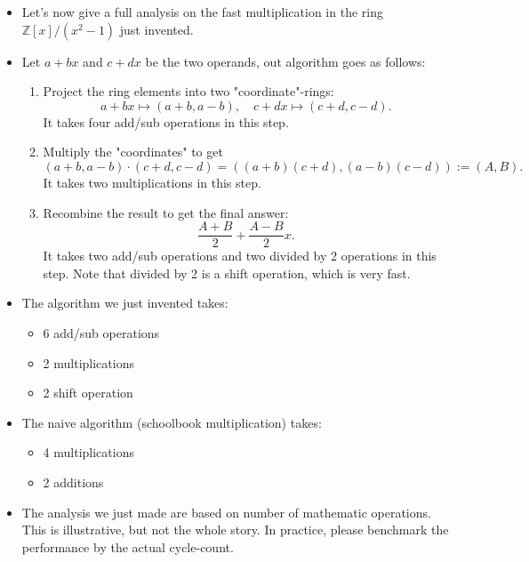 \begin{frame}
    \begin{itemize}
        \item Let's now give a full analysis on the fast multiplication 
            in the ring \( \mathbb{Z}[x] / (x^{2} - 1) \) just invented.
        \item Let \( a + b x \) and \( c + d x \) be the two operands, 
            out algorithm goes as follows:
            \begin{enumerate}
                \item Project the ring elements into two "coordinate"-rings:
                    \[
                        a + b x \mapsto (a+b, a-b),\quad c + d x \mapsto (c+d, c-d).
                    \]
                    It takes four add/sub operations in this step.
                \item Multiply the "coordinates" to get
                    \[
                        (a+b, a-b) \cdot (c+d, c-d) = ((a+b)(c+d), (a-b)(c-d)) := (A,B).
                    \]
                    It takes two multiplications in this step.

                \item Recombine the result to get the final answer:
                    \[
                        \frac{A+B}{2} + \frac{A-B}{2}x.
                    \]
                    It takes two add/sub operations and two divided by 2 operations in this step.
                    Note that divided by 2 is a shift operation, which is very fast.
            \end{enumerate}
    \end{itemize}
\end{frame}

\begin{frame}
    \begin{itemize}
        \item The algorithm we just invented takes:
            \begin{itemize}
                \item 6 add/sub operations
                \item 2 multiplications
                \item 2 shift operation
            \end{itemize}
        \item The naive algorithm (schoolbook multiplication) takes:
            \begin{itemize}
                \item 4 multiplications
                \item 2 additions
            \end{itemize}
        \item The analysis we just made are based on number of mathematic operations.
            This is illustrative, but not the whole story.
            In practice, please benchmark the performance by the actual cycle-count.
    \end{itemize}
\end{frame}


